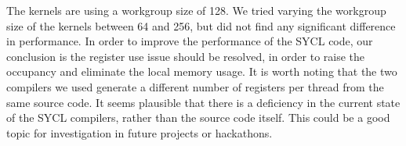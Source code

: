 \documentclass[../main]{subfiles}
\begin{document}
The kernels are using a workgroup size of 128.
We tried varying the workgroup size of the kernels between 64 and 256, but did not find any significant difference in performance.
In order to improve the performance of the SYCL code, our conclusion is the register use issue should be resolved, in order to raise the occupancy and eliminate the local memory usage.
It is worth noting that the two compilers we used generate a different number of registers per thread from the same source code.
It seems plausible that there is a deficiency in the current state of the SYCL compilers, rather than the source code itself.
This could be a good topic for investigation in future projects or hackathons.

\end{document}
